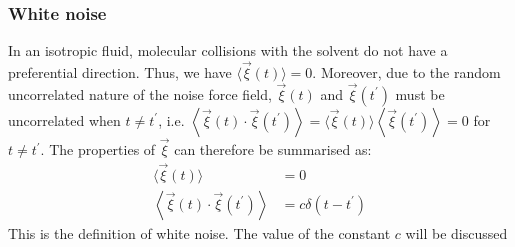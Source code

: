 \documentclass[12pt,a4paper]{article}
\begin{document}
\subsubsection{White noise}
In an isotropic fluid, molecular collisions with the solvent do not have a preferential direction. Thus, we have $\langle\vec{\xi}(t)\rangle=0$. Moreover, due to the random uncorrelated nature of the noise force field, $\vec{\xi}(t)$ and $\vec{\xi}\left(t^{\prime}\right)$ must be uncorrelated when $t \neq t^{\prime}$, i.e. $\left\langle\vec{\xi}(t) \cdot \vec{\xi}\left(t^{\prime}\right)\right\rangle=\langle\vec{\xi}(t)\rangle\left\langle\vec{\xi}\left(t^{\prime}\right)\right\rangle=0$ for $t \neq t^{\prime}$. The properties of $\vec{\xi}$ can therefore be summarised as:
$$
\begin{aligned}
\langle\vec{\xi}(t)\rangle & =0 \\
\left\langle\vec{\xi}(t) \cdot \vec{\xi}\left(t^{\prime}\right)\right\rangle & =c \delta\left(t-t^{\prime}\right)
\end{aligned}
$$
This is the definition of white noise. The value of the constant $c$ will be discussed
\end{document}
